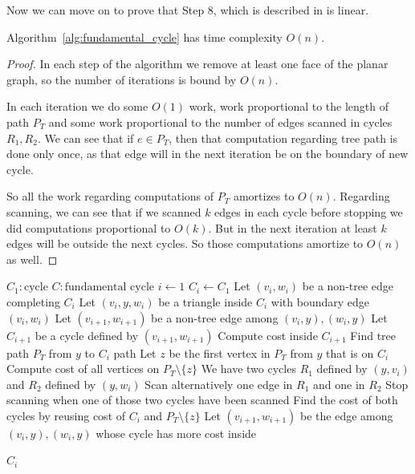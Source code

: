 Now we can move on to prove that Step 8, which is described in  is linear.
\begin{lemma}\label{lem:fundamental_cycle_algo}
    Algorithm~\ref{alg:fundamental_cycle} has time complexity $O(n)$.
\end{lemma}
\begin{proof}
    In each step of the algorithm we remove at least one face of the planar
    graph, so the number of iterations is bound by $O(n)$.

    In each iteration we
    do some $O(1)$ work, work proportional to the length of path $P_T$ and some
    work proportional to the number of edges scanned in cycles $R_1, R_2$. We
    can see that if $e \in P_T$, then that computation regarding tree path is
    done only once, as that edge will in the next iteration be on the boundary
    of new cycle.

    So all the work regarding computations of $P_T$ amortizes to
    $O(n)$. Regarding scanning, we can see that if we scanned $k$ edges in each
    cycle before stopping we did computations proportional to $O(k)$. But in the
    next iteration at least $k$ edges will be outside the next cycles. So those
    computations amortize to $O(n)$ as well.
\end{proof}
        \begin{algorithm}[H]
            \small
    \caption{$\text{FUNDAMENTAL\_CYCLE}$}
    \label{alg:fundamental_cycle}
    \begin{algorithmic}[1]
        \Require $C_1 \colon \text{cycle}$
        \Ensure $C \colon \text{fundamental cycle}$
        \State $i \gets 1$
        \State $C_i \gets C_1$
        \State Let $(v_i, w_i)$ be a non-tree edge completing $C_i$
        \State Let $(v_i, y, w_i)$ be a triangle inside $C_i$ with boundary edge
        $(v_i, w_i)$
        \State Let $(v_{i+1}, w_{i+1})$ be a non-tree edge among $(v_i, y),
        (w_i, y)$
        \State Let $C_{i+1}$ be a cycle defined by $(v_{i+1}, w_{i+1})$
        \State Compute cost inside $C_{i+1}$
        \Else
        \State Find tree path $P_T$ from $y$ to $C_i$ path
        \State Let $z$ be the first vertex in $P_T$ from $y$ that is on $C_i$
        \State Compute cost of all vertices on $P_T \setminus \{z\}$
        \State We have two cycles $R_1$ defined by $(y, v_i)$ and $R_2$ defined
        by $(y, w_i)$
        \State Scan alternatively one edge in $R_1$ and one in $R_2$
        \State Stop scanning when one of those two cycles have been scanned
        \State Find the cost of both cycles by reusing cost of $C_i$
        and $P_T \setminus \{z\}$
        \State Let $(v_{i+1}, w_{i+1})$ be the edge among $(v_i, y),
        (w_i, y)$ whose cycle has more cost inside
        \EndIf
        \EndWhile
    \end{algorithmic}
    \Return $C_i$
\end{algorithm}
